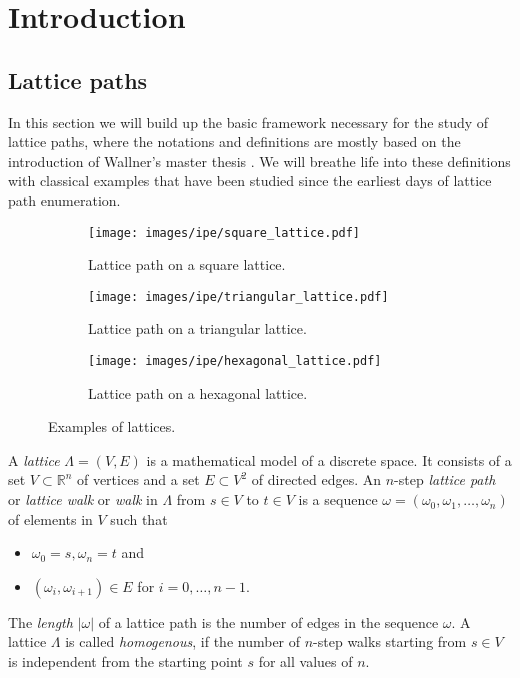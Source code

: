 \chapter{Introduction}
\label{chapter:introduction}

\section{Lattice paths}

In this section we will build up the basic framework necessary for the study of lattice paths, where the notations and definitions are mostly based on the introduction of Wallner's master thesis \cite{Wallner}. We will breathe life into these definitions with classical examples that have been studied since the earliest days of lattice path enumeration.

\begin{figure}[hbt!]
  \centering
  \begin{subfigure}{0.32 \textwidth}
    \centering
    \texttt{[image: images/ipe/square\_lattice.pdf]}
    \caption{Lattice path on a square lattice.}
  \end{subfigure}
  \hfill
  \begin{subfigure}{0.32 \textwidth}
    \centering
    \texttt{[image: images/ipe/triangular\_lattice.pdf]}
    \caption{Lattice path on a triangular lattice.}
  \end{subfigure}
  \hfill
  \begin{subfigure}{0.32 \textwidth}
    \centering
    \texttt{[image: images/ipe/hexagonal\_lattice.pdf]}
    \caption{Lattice path on a hexagonal lattice.}
  \end{subfigure}
  \caption{Examples of lattices.}
  \label{fig:lattices}
\end{figure}

\begin{definition}
  A \textit{lattice} $\Lambda = (V,E)$ is a mathematical model of a discrete space. It consists of a set $V \subset \mathbb{R}^n$ of vertices and a set $E \subset V^2$ of directed edges. An $n$-step \textit{lattice path} or \textit{lattice walk} or \textit{walk} in $\Lambda$ from $s \in V$ to $t \in V$ is a sequence $\omega = (\omega_0,\omega_1,\dots,\omega_n)$ of elements in $V$ such that 
  \begin{itemize}
    \item $\omega_0 = s, \omega_n = t$ and
    \item $(\omega_i,\omega_{i+1}) \in E$ for $i = 0, \dots, n - 1$.
  \end{itemize}
  The \textit{length} $|\omega|$ of a lattice path is the number of edges in the sequence $\omega$.
  A lattice $\Lambda$ is called \textit{homogenous}, if the number of $n$-step walks starting from $s \in V$ is independent from the starting point $s$ for all values of $n$.
\end{definition}

